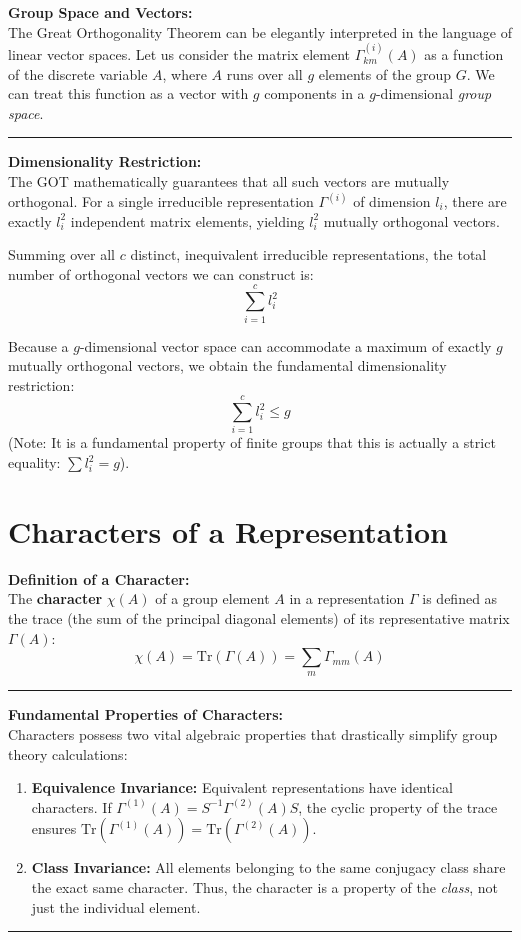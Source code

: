 \documentclass[11pt, a4paper]{report}
\begin{document}
\textbf{Group Space and Vectors:}\\
The Great Orthogonality Theorem can be elegantly interpreted in the language of linear vector spaces. Let us consider the matrix element $\Gamma_{km}^{(i)}(A)$ as a function of the discrete variable $A$, where $A$ runs over all $g$ elements of the group $G$. We can treat this function as a vector with $g$ components in a $g$-dimensional \textit{group space}.

\vspace{1em}
\hrule
\vspace{1em}

\textbf{Dimensionality Restriction:}\\
The GOT mathematically guarantees that all such vectors are mutually orthogonal. For a single irreducible representation $\Gamma^{(i)}$ of dimension $l_i$, there are exactly $l_i^2$ independent matrix elements, yielding $l_i^2$ mutually orthogonal vectors.

Summing over all $c$ distinct, inequivalent irreducible representations, the total number of orthogonal vectors we can construct is:
\[ \sum_{i=1}^c l_i^2 \]

Because a $g$-dimensional vector space can accommodate a maximum of exactly $g$ mutually orthogonal vectors, we obtain the fundamental dimensionality restriction:
\[ \sum_{i=1}^c l_i^2 \le g \]
(Note: It is a fundamental property of finite groups that this is actually a strict equality: $\sum l_i^2 = g$).

\section{Characters of a Representation}

\textbf{Definition of a Character:}\\
The \textbf{character} $\chi(A)$ of a group element $A$ in a representation $\Gamma$ is defined as the trace (the sum of the principal diagonal elements) of its representative matrix $\Gamma(A)$:
\[ \chi(A) = \text{Tr}(\Gamma(A)) = \sum_{m} \Gamma_{mm}(A) \]

\vspace{1em}
\hrule
\vspace{1em}

\textbf{Fundamental Properties of Characters:}\\
Characters possess two vital algebraic properties that drastically simplify group theory calculations:
\begin{enumerate}
    \item \textbf{Equivalence Invariance:} Equivalent representations have identical characters. If $\Gamma^{(1)}(A) = S^{-1}\Gamma^{(2)}(A)S$, the cyclic property of the trace ensures $\text{Tr}(\Gamma^{(1)}(A)) = \text{Tr}(\Gamma^{(2)}(A))$.
    \item \textbf{Class Invariance:} All elements belonging to the same conjugacy class share the exact same character. Thus, the character is a property of the \textit{class}, not just the individual element.
\end{enumerate}
\vspace{1em}
\hrule
\vspace{1em}
\end{document}
